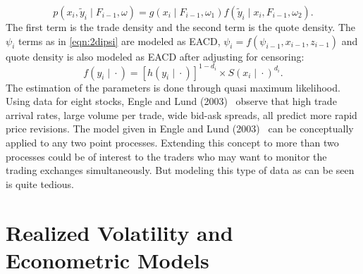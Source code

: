 	\begin{equation} \label{eqn:2pxiyi}
	p(x_i,\widetilde{y}_i \;|\; F_{i-1}, \omega) = g(x_i \;|\; F_{i-1}, \omega_1) f(\widetilde{y}_i \;|\; x_i, F_{i-1}, \omega_2).
	\end{equation}
The first term is the trade density and the second term is the quote density. The $\psi_i$ terms as in \eqref{eqn:2dipsi} are modeled as EACD, $\psi_i= f(\psi_{i-1}, x_{i-1}, z_{i-1})$ and quote density is also modeled as EACD after adjusting for censoring:
	\begin{equation} \label{eqn:2fdot}
	f(y_i \;|\; \cdot) = [h(y_i \;|\; \cdot)]^{1 - d_i} \times S(x_i \;|\; \cdot)^{d_i}.
	\end{equation}
The estimation of the parameters is done through quasi maximum likelihood. Using data for eight stocks, Engle and Lund (2003)~\cite{englelunde} observe that high trade arrival rates, large volume per trade, wide bid-ask spreads, all predict more rapid price revisions. The model given in Engle and Lund (2003)~\cite{englelunde} can be conceptually applied to any two point processes. Extending this concept to more than two processes could be of interest to the traders who may want to monitor the trading exchanges simultaneously. But modeling this type of data as can be seen is quite tedious. 



\section{Realized Volatility and Econometric Models}

